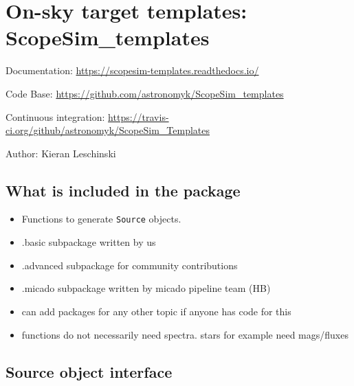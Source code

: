 

\section{On-sky target templates: ScopeSim\_templates%
  \label{on-sky-target-templates-scopesim-templates}%
}

Documentation: \url{https://scopesim-templates.readthedocs.io/}

Code Base: \url{https://github.com/astronomyk/ScopeSim_templates}

Continuous integration: \url{https://travis-ci.org/github/astronomyk/ScopeSim_Templates}

Author: Kieran Leschinski


\subsection{What is included in the package%
  \label{what-is-included-in-the-package}%
}

\begin{itemize}
\item Functions to generate \texttt{Source} objects.

\item .basic subpackage written by us

\item .advanced subpackage for community contributions

\item .micado subpackage written by micado pipeline team (HB)

\item can add packages for any other topic if anyone has code for this

\item functions do not necessarily need spectra. stars for example need mags/fluxes
\end{itemize}


\subsection{Source object interface%
  \label{source-object-interface}%
}

